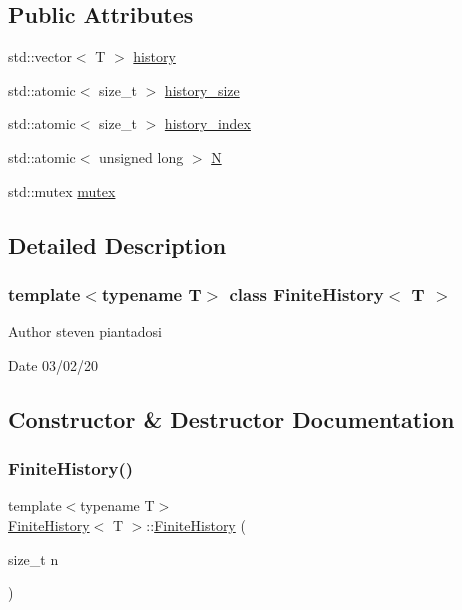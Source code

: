 \subsection*{Public Attributes}
\begin{DoxyCompactItemize}
\item 
std\+::vector$<$ T $>$ \hyperlink{class_finite_history_ae11bec06f0aca5c036d3e44dfe998cbe}{history}
\item 
std\+::atomic$<$ size\+\_\+t $>$ \hyperlink{class_finite_history_aa744ad1f9f0ef54fbd575eef672adc08}{history\+\_\+size}
\item 
std\+::atomic$<$ size\+\_\+t $>$ \hyperlink{class_finite_history_a1730270169bb022306e9a40e871aec35}{history\+\_\+index}
\item 
std\+::atomic$<$ unsigned long $>$ \hyperlink{class_finite_history_a5967a95efc3ef8aa4391942da511eab7}{N}
\item 
std\+::mutex \hyperlink{class_finite_history_a677c5c1c7115d5c8c8381aa4332025c6}{mutex}
\end{DoxyCompactItemize}


\subsection{Detailed Description}
\subsubsection*{template$<$typename T$>$\newline
class Finite\+History$<$ T $>$}

\begin{DoxyAuthor}{Author}
steven piantadosi 
\end{DoxyAuthor}
\begin{DoxyDate}{Date}
03/02/20 
\end{DoxyDate}


\subsection{Constructor \& Destructor Documentation}
\mbox{\label{class_finite_history_a9300fde1231d7307a97349caa4745b1a}} 
\subsubsection{\texorpdfstring{Finite\+History()}{FiniteHistory()}\hspace{0.1cm}{\footnotesize\ttfamily [1/4]}}
{\footnotesize\ttfamily template$<$typename T$>$ \\
\hyperlink{class_finite_history}{Finite\+History}$<$ T $>$\+::\hyperlink{class_finite_history}{Finite\+History} (\begin{DoxyParamCaption}\item[{size\+\_\+t}]{n }\end{DoxyParamCaption})\hspace{0.3cm}{\ttfamily [inline]}}

